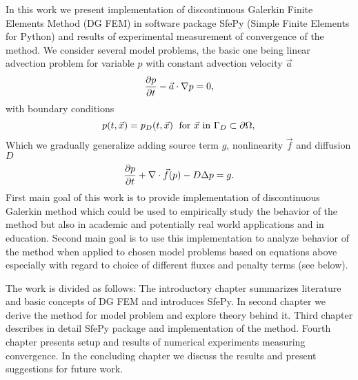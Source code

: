 In this work we present implementation of discontinuous Galerkin Finite 
Elements Method (DG FEM) in software package SfePy (Simple Finite Elements for 
Python) and results of experimental measurement of convergence of the method. 
We consider several model problems, the basic one being linear 
advection problem for variable $p$ with constant advection velocity $\vec{a}$
$$
\frac{\partial p}{\partial t} - \vec{a}\cdot\nabla p = 0,
$$
with boundary conditions
$$
p(t, \vec{x}) = p_D(t, \vec{x}) \; \text{ for } \vec{x} \text{ in } \Gamma_D \subset 
\partial\Omega, \\
$$
Which we gradually generalize adding source term $g$, nonlinearity $\vec{f}$ 
and diffusion $D$
\begin{equation*}
	\frac{\partial p}{\partial t} + \nabla\cdot \vec{f}(p) - D\Delta p = g.
\end{equation*}
First main goal of this work is to provide implementation of discontinuous Galerkin 
method which could be used to empirically study the behavior of the method but also in 
academic and potentially real world applications and in education. 
Second main goal is to use this implementation to analyze behavior of the method when 
applied to chosen model problems based on equations above especially with regard to 
choice of different fluxes and penalty terms (see below).

The work is divided as follows: The introductory chapter summarizes literature 
and basic concepts of DG FEM and introduces SfePy. In second chapter we derive the 
method for model problem and explore theory behind it. Third chapter describes 
in detail SfePy package and implementation of the method. Fourth chapter 
presents setup and results of numerical experiments measuring convergence. 
In the concluding chapter we discuss the results and present 
suggestions for future work.

